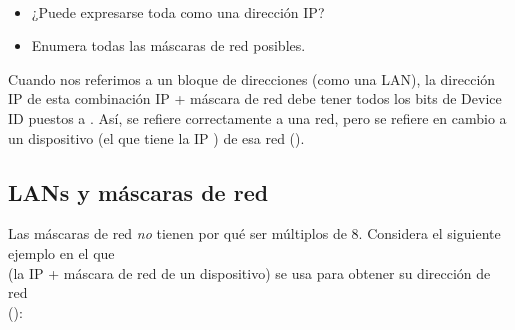 \begin{exercise}\ \\[-0.65cm]
\begin{itemize}
\item ¿Puede expresarse toda  como una dirección IP?
\item Enumera todas las máscaras de red posibles.\\[-0.5cm]
\end{itemize}
\end{exercise}

Cuando nos referimos a un bloque de direcciones (como una LAN), 
la dirección IP de esta combinación IP + máscara de red
debe tener todos los bits de Device ID puestos a . 
Así,  se refiere correctamente a una red, pero
 se refiere en cambio a un dispositivo 
(el que tiene la IP ) de esa red ().

\subsection{LANs y máscaras de red}\label{sec:layer3:lans_and_netmasks}

Las máscaras de red \textit{no} tienen por qué ser múltiplos de $8$. Considera el siguiente ejemplo en el que \\
 (la IP + máscara de red de un dispositivo) se usa para obtener su dirección de red\\
():\\

